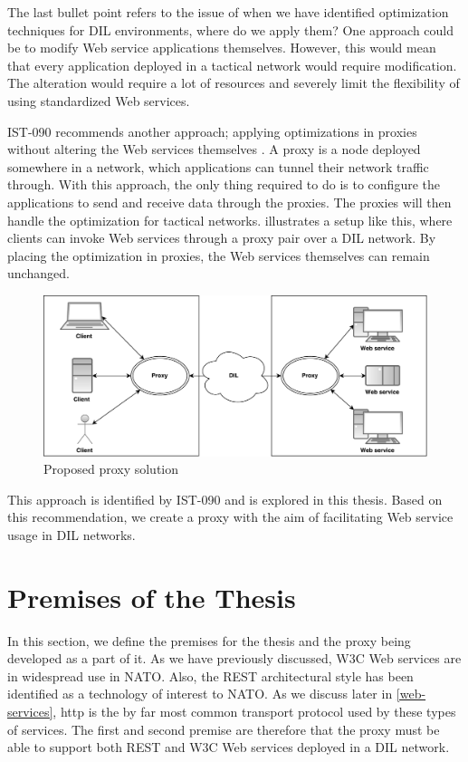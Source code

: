 The last bullet point refers to the issue of when we have identified
optimization techniques for DIL environments, where do we apply them? One
approach could be to modify Web service applications themselves. However, this
would mean that every application deployed in a tactical network would require
modification. The alteration would require a lot of resources and severely limit
the flexibility of using standardized Web services.

IST-090 recommends another approach; applying optimizations in proxies without
altering the Web services themselves \cite{ist-090}. A proxy is a node deployed
somewhere in a network, which applications can tunnel their network traffic
through. With this approach, the only thing required to do is to configure the
applications to send and receive data through the proxies. The proxies will then
handle the optimization for tactical networks.
 illustrates a setup like this, where
clients can invoke Web services through a proxy pair over a DIL network. By
placing the optimization in proxies, the Web services themselves can remain
unchanged.

\begin{figure}[h] \includegraphics[width=\textwidth]{images/dil.pdf}
\caption{Proposed proxy solution} \label{figure-proposed-proxy-solution}
\end{figure}

This approach is identified by IST-090 and is explored in this thesis. Based on
this recommendation, we create a proxy with the aim of facilitating Web service
usage in DIL networks.


\section{Premises of the Thesis}

In this section, we define the premises for the thesis and the proxy being
developed as a part of it. As we have previously discussed, W3C Web services are
in widespread use in NATO. Also, the REST architectural style has been identified
as a technology of interest to NATO. As we discuss later in \cref{web-services},
\gls{http} is the by far most common transport protocol used by these types of
services. The first and second premise are therefore that the proxy must be able
to support both REST and W3C Web services deployed in a DIL network.

